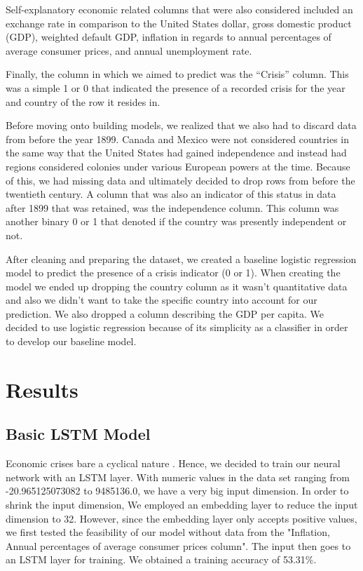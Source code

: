 \documentclass[12pt]{article}
\begin{document}
Self-explanatory economic related columns that were also considered included an exchange rate in comparison to the United States dollar, gross domestic product (GDP), weighted default GDP, inflation in regards to annual percentages of average consumer prices, and annual unemployment rate. 

Finally, the column in which we aimed to predict was the “Crisis” column. This was a simple 1 or 0 that indicated the presence of a recorded crisis for the year and country of the row it resides in.

Before moving onto building models, we realized that we also had to discard data from before the year 1899. Canada and Mexico were not considered countries in the same way that the United States had gained independence and instead had regions considered colonies under various European powers at the time. Because of this, we had missing data and ultimately decided to drop rows from before the twentieth century. A column that was also an indicator of this status in data after 1899 that was retained, was the independence column. This column was another binary 0 or 1 that denoted if the country was presently independent or not.

After cleaning and preparing the dataset, we created a baseline logistic regression model to predict the presence of a crisis indicator (0 or 1). When creating the model we ended up dropping the country column as it wasn’t quantitative data and also we didn’t want to take the specific country into account for our prediction. We also dropped a column describing the GDP per capita. We decided to use logistic regression because of its simplicity as a classifier in order to develop our baseline model.



\section{Results}
\subsection{Basic LSTM Model}
Economic crises bare a cyclical nature \cite{10.1007/978-3-030-15577-3_11}. Hence, we decided to train our neural network with an LSTM layer. With numeric values in the data set ranging from -20.965125073082 to 9485136.0, we have a very big input dimension. In order to shrink the input dimension, We employed an embedding layer to reduce the input dimension to 32. However, since the embedding layer only accepts positive values, we first tested the feasibility of our model without data from the "Inflation, Annual percentages of average consumer prices column". The input then goes to an LSTM layer for training. We obtained a training accuracy of 53.31\%.
\end{document}
